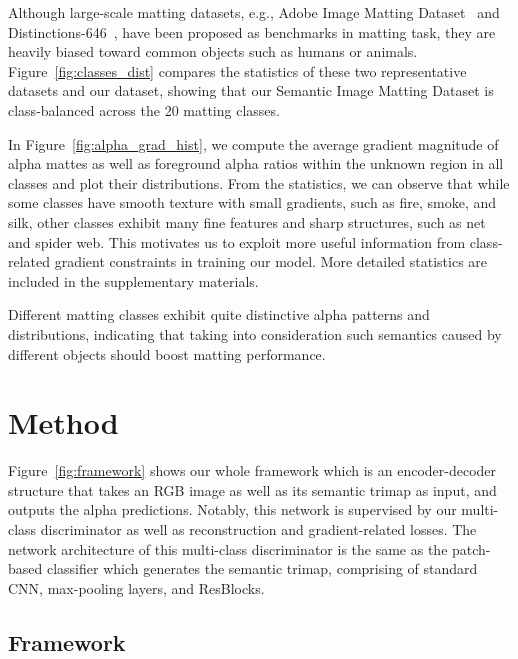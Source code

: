 \documentclass[10pt,twocolumn,letterpaper]{article}
\begin{document}
\vspace{4pt}
 Although  large-scale matting datasets, e.g., Adobe Image Matting Dataset~\cite{Xu2017DeepIM} and Distinctions-646~\cite{qiao2020attention}, have been proposed as benchmarks in matting task, they are heavily biased toward common objects such as humans or animals.
Figure~\ref{fig:classes_dist} compares the statistics of these two representative datasets and our dataset, showing that  our Semantic Image Matting Dataset is class-balanced across the 20 matting classes.


\vspace{4pt}
In Figure~\ref{fig:alpha_grad_hist}, 
 we compute the average gradient magnitude of alpha mattes as well as foreground alpha ratios within the unknown region in all classes and plot their distributions.  From the statistics, we can observe that while  some classes have smooth texture with small gradients, such as fire, smoke, and silk, other classes exhibit many fine features and sharp structures, such as net and spider web. This motivates us to exploit more useful information from class-related gradient constraints in training our model. More detailed statistics are included in the supplementary materials.
 
 Different matting classes exhibit quite distinctive alpha patterns and distributions, indicating that taking into consideration such semantics caused by different objects should boost matting performance.


\vspace{-2pt}
\section{Method}
\vspace{-2pt}
Figure~\ref{fig:framework} shows 
our whole framework which is an encoder-decoder structure that takes an RGB image as well as its semantic trimap as input, and outputs the alpha predictions. Notably, this network is supervised by our multi-class discriminator as well as reconstruction and gradient-related losses. The network architecture of this multi-class discriminator is the same as the patch-based classifier which generates the semantic trimap, comprising of standard CNN, max-pooling layers, and ResBlocks.


\vspace{-1pt}
\subsection{Framework}
\label{sec:framework}
\end{document}
